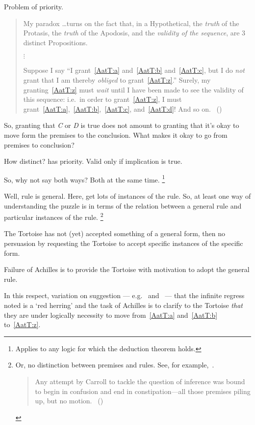 \begin{note}
  Problem of priority.
  \begin{quote}
    My paradox \dots turns on the fact that, in a Hypothetical, the \emph{truth} of the Protasis, the \emph{truth} of the Apodosis, and the \emph{validity of the sequence}, are 3 distinct Propositions.

    \mbox{}\hfill\(\vdots\)\hfill\mbox{}

    Suppose I say ``I grant~\ref{AatT:a} and~\ref{AatT:b} and~\ref{AatT:c}, but I do \emph{not} grant that I am thereby \emph{obliged} to grant~\ref{AatT:z}.''
    Surely, my granting~\ref{AatT:z} must \emph{wait} until I have been made to see the validity of this sequence: i.e.\ in order to grant~\ref{AatT:z}, I must grant~\ref{AatT:a},~\ref{AatT:b},~\ref{AatT:c}, and~\ref{AatT:d}! And so on.%
    \mbox{ }\hfill\mbox{(\citeyear[472]{Carroll:1977wl})}
  \end{quote}

  So, granting that \emph{C} or \emph{D} is true does not amount to granting that it's okay to move form the premises to the conclusion.
  What makes it okay to go from premises to conclusion?

  How distinct?
  \citeauthor{Carroll:1977wl} has priority.
  Valid only if implication is true.

  So, why not say both ways?
  Both at the same time.%
  \footnote{
    Applies to any logic for which the deduction theorem holds.
  }

  Well, rule is general.
  Here, get lots of instances of the rule.
  So, at least one way of understanding the puzzle is in terms of the relation between a general rule and particular instances of the rule.%
  \footnote{
    Or, no distinction between premises and rules.
    See, for example,~\textcite{Smiley:1995wk}.
    \begin{quote}
      Any attempt by Carroll to tackle the question of inference was bound to begin in confusion and end in constipation---all those premises piling up, but no motion.\newline
      \mbox{ }\hfill\mbox{(\citeyear[727]{Smiley:1995wk})}
    \end{quote}
  }

  The Tortoise has not (yet) accepted something of a general form, then no persuasion by requesting the Tortoise to accept specific instances of the specific form.

  Failure of Achilles is to provide the Tortoise with motivation to adopt the general rule.

  In this respect, variation on suggestion --- e.g.\ \textcite[21--22,33]{Thomson:2010tt} and~\textcite[573]{Wisdom:1974uc} ---  that the infinite regress \citeauthor{Carroll:1895uj} noted is a `red herring' and the task of Achilles is to clarify to the Tortoise \emph{that} they are under logically necessity to move from~\ref{AatT:a} and~\ref{AatT:b} to~\ref{AatT:z}.
\end{note}

